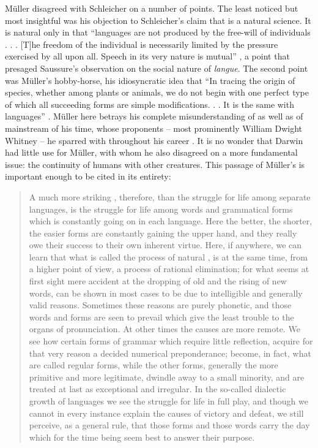 \documentclass[output=paper,
modfonts
]{LSP/langsci}
\begin{document}
Müller disagreed with Schleicher on a number of points.  
The least noticed but most insightful was his objection to Schleicher's claim that  is a natural science.
It is natural only in that ``languages are not produced by the free-will of individuals . . . 
[T]he freedom of the individual is necessarily limited by the pressure exercised by all upon all. 
Speech in its very nature is mutual'' \citep[258]{muller1870}, a point that presaged Saussure's observation on the social nature of \textit{langue}. The second point was Müller's hobby-horse, his idiosyncratic idea that ``In tracing the origin of species, whether among plants or animals, we do not begin with one perfect type of which all succeeding forms are simple modifications. . . It is the same with languages'' \citep[258]{muller1870}. Müller here betrays his complete misunderstanding of  as well as of mainstream  of his time, whose proponents -- most prominently William Dwight Whitney  -- he sparred with throughout his career \citep{Whitney1875,alter1999}. It is no wonder that Darwin had little use for Müller, with whom he also disagreed on a more fundamental issue: the continuity of humans with other creatures. This passage of Müller's is important enough to be cited in its entirety:

\begin{quote}
A much more striking , therefore, than the struggle for life among separate languages, is the struggle for life among words and grammatical forms which is constantly going on in each language. Here the better, the shorter, the easier forms are constantly gaining the upper hand, and they really owe their success to their own inherent virtue. Here, if anywhere, we can learn that what is called the process of natural , is at the same time, from a higher point of view, a process of rational elimination; for what seems at first sight mere accident at the dropping of old and the rising of new words, can be shown in most cases to be due to intelligible and generally valid reasons. Sometimes these reasons are purely phonetic, and those words and forms are seen to prevail which give the least trouble to the organs of pronunciation. At other times the causes are more remote. We see how certain forms of grammar which require little reflection, acquire for that very reason a decided numerical preponderance; become, in fact, what are called regular forms, while the other forms, generally the more primitive and more legitimate, dwindle away to a small minority, and are treated at last as exceptional and irregular. In the so-called dialectic growth of languages we see the struggle for life in full play, and though we cannot in every instance explain the causes of victory and defeat, we still perceive, as a general rule, that those forms and those words carry the day which for the time being seem best to answer their purpose. \citep[258]{muller1870}
\end{quote}
\end{document}
